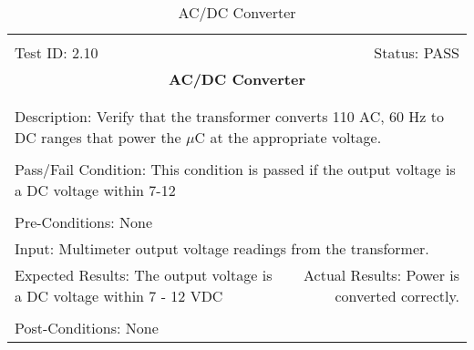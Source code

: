 \documentclass[titlepage]{article}
\begin{document}
\begin{center}
\begin{table}[h!]
\begin{tabular}{|l r|}\hline&\\[-2mm]
	Test ID: 2.10	&Status: PASS\\[-3mm]
	\multicolumn{2}{|c|}{\textbf{\large{AC/DC Converter}}}\\&\\\hline&\\[-3mm]
	\multicolumn{2}{|p{\textwidth}|}{Description: Verify that the transformer converts 110 AC, 60 Hz to DC ranges that power the $\mu$C at the appropriate voltage.}\\[1mm]\hline&\\[-3mm]
	\multicolumn{2}{|p{\textwidth}|}{Pass/Fail Condition: This condition is passed if the output voltage is a DC voltage within 7-12}\\[1mm]\hline&\\[-3mm]
	\multicolumn{2}{|p{\textwidth}|}{Pre-Conditions: None}\\[4mm]
	\multicolumn{2}{|p{\textwidth}|}{Input: Multimeter output voltage readings from the transformer.}\\[2mm]\hline
	\multicolumn{1}{|p{0.49\textwidth}}{Expected Results: The output voltage is a DC voltage within 7 - 12 VDC}	&\multicolumn{1}{|p{0.45\textwidth}|}{Actual Results: Power is converted correctly.}\\\hline&\\[-3mm]
	\multicolumn{2}{|p{\textwidth}|}{Post-Conditions: None}\\\hline
\end{tabular}
\caption{AC/DC Converter}
\end{table}
\end{center}
\end{document}
